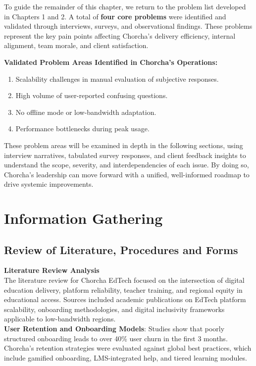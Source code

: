 \documentclass[12pt,a4paper,oneside]{book}
\begin{document}
To guide the remainder of this chapter, we return to the problem list developed in Chapters 1 and 2. A total of \textbf{four core problems} were identified and validated through interviews, surveys, and observational findings. These problems represent the key pain points affecting Chorcha’s delivery efficiency, internal alignment, team morale, and client satisfaction.

\textbf{Validated Problem Areas Identified in Chorcha’s Operations:}

\begin{enumerate}
  \item Scalability challenges in manual evaluation of subjective responses.
  \item High volume of user-reported confusing questions.
  \item No offline mode or low-bandwidth adaptation.
  \item Performance bottlenecks during peak usage.
\end{enumerate}

These problem areas will be examined in depth in the following sections, using interview narratives, tabulated survey responses, and client feedback insights to understand the scope, severity, and interdependencies of each issue. By doing so, Chorcha’s leadership can move forward with a unified, well-informed roadmap to drive systemic improvements.

\section{Information Gathering}

\subsection{Review of Literature, Procedures and Forms}

\textbf{Literature Review Analysis} \\
The literature review for Chorcha EdTech focused on the intersection of digital education delivery, platform reliability, teacher training, and regional equity in educational access. Sources included academic publications on EdTech platform scalability, onboarding methodologies, and digital inclusivity frameworks applicable to low-bandwidth regions.\\

\textbf{User Retention and Onboarding Models}: Studies show that poorly structured onboarding leads to over 40\% user churn in the first 3 months. Chorcha’s retention strategies were evaluated against global best practices, which include gamified onboarding, LMS-integrated help, and tiered learning modules.\\
\end{document}
